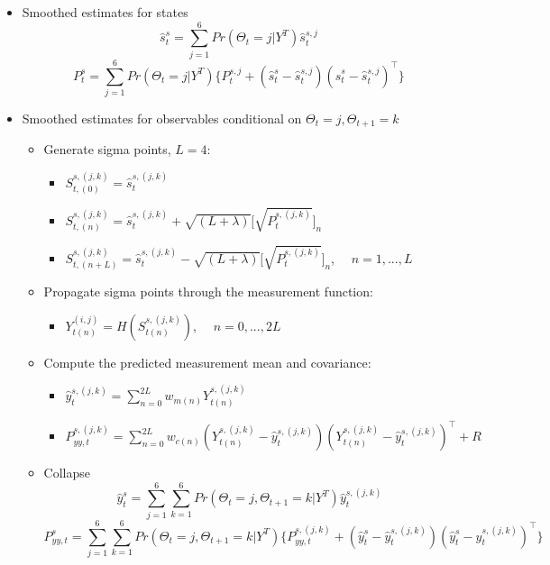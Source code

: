 \documentclass[12pt,letter,leqno]{article}
\theoremstyle{asn}
\theoremstyle{lem}
\theoremstyle{slem}
\theoremstyle{prop}
\theoremstyle{appprop}
\theoremstyle{rem}
\theoremstyle{defn}
\begin{document}
\begin{itemize}
\item Smoothed estimates for states
\begin{equation*}
\hat{s}_t^{s}=\sum_{j=1}^6 Pr(\Theta_t=j|Y^T)\hat{s}_t^{s,j}
\end{equation*}
\begin{equation*}
P_t^{s}=\sum_{j=1}^6 Pr(\Theta_t=j|Y^T)\{P_t^{s,j}+(\hat{s}_t^{s}-\hat{s}_t^{s,j})(\hat{s}_t^{s}-\hat{s}_t^{s,j})^\top \}
\end{equation*}

\item Smoothed estimates for observables conditional on $\Theta_t=j,\Theta_{t+1}=k$
\begin{itemize}
\item Generate sigma points, $L=4$: 
\begin{itemize}
\item $S_{t,(0)}^{s,(j,k)}  =\hat{s}_t^{s,(j,k)}$
\item $S_{t,(n)}^{s,(j,k)}  =\hat{s}_t^{s,(j,k)} + \sqrt{(L+\lambda)}\big[\sqrt{P_t^{s,(j,k)}}\big]_n$
\item $S_{t,(n+L)}^{s,(j,k)}  =\hat{s}_t^{s,(j,k)} - \sqrt{(L+\lambda)}\big[\sqrt{P_t^{s,(j,k)}}\big]_n$, $\quad  n=1,...,L$
\end{itemize}

\item Propagate sigma points through the measurement function:
\begin{itemize}
\item $Y_{t(n)}^{(i,j)} = H(S_{t(n)}^{s,(j,k)})$, $\quad  n=0,...,2L$
\end{itemize}
\item Compute the predicted measurement mean and covariance:
\begin{itemize}
\item $\hat{y}_t^{s,(j,k)} = \sum_{n=0}^{2L} w_{m(n)} Y_{t(n)}^{s,(j,k)}$
\item $P_{yy,t}^{s,(j,k)} = \sum_{n=0}^{2L} w_{c(n)} (Y_{t(n)}^{s,(j,k)} - \hat{y}_t^{s,(j,k)})(Y_{t(n)}^{s,(j,k)} - \hat{y}_t^{s,(j,k)})^\top + R$
\end{itemize}

\item Collapse 
\begin{equation*}
\hat{y}_t^s=\sum_{j=1}^6\sum_{k=1}^6  Pr(\Theta_t=j,\Theta_{t+1}=k|Y^T) \hat{y}_t^{s,(j,k)}
\end{equation*}
\begin{equation*}
P_{yy,t}^s=\sum_{j=1}^6\sum_{k=1}^6  Pr(\Theta_t=j,\Theta_{t+1}=k|Y^T) \{P_{yy,t}^{s,(j,k)}+(\hat{y}_t^s-\hat{y}_t^{s,(j,k)})(\hat{y}_t^s-\hat{y}_t^{s,(j,k)})^\top \}
\end{equation*}
\end{itemize}
\end{itemize}
\end{document}
